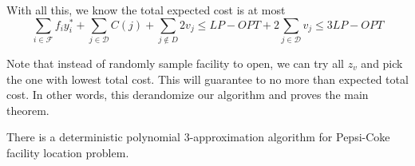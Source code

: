 With all this, we know the total expected cost is at most
\[  \sum_{i \in \mathcal{F}} f_i y^*_i + \sum_{j \in \mathcal{D}} C(j) + \sum_{j \not \in D} 2v_j
\le LP-OPT + 2 \sum_{j \in \mathcal{D}} v_j \le 3LP-OPT   \]

Note that instead of randomly sample facility to open, we can try all $z_v$ and pick the one
with lowest total cost. This will guarantee to no more than expected total cost.
In other words, this derandomize our algorithm and proves the main theorem.

\begin{thm}
There is a deterministic polynomial 3-approximation algorithm for Pepsi-Coke facility location problem.
\end{thm}